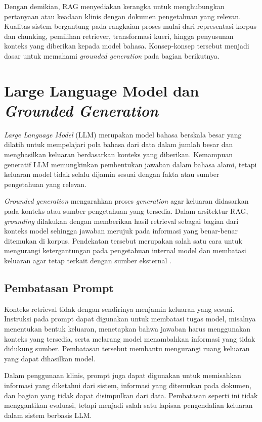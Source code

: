 Dengan demikian, RAG menyediakan kerangka untuk menghubungkan pertanyaan atau keadaan klinis dengan dokumen pengetahuan yang relevan. Kualitas sistem bergantung pada rangkaian
proses mulai dari representasi korpus dan chunking, pemilihan retriever, transformasi kueri, hingga penyusunan konteks yang diberikan kepada model bahasa.
Konsep-konsep tersebut menjadi dasar untuk memahami \textit{grounded generation} pada bagian berikutnya.

\section{Large Language Model dan \textit{Grounded Generation}}
\label{sec:bab2-llm-grounded-generation}

\textit{Large Language Model} (LLM) merupakan model bahasa berskala besar yang dilatih untuk mempelajari pola bahasa dari data dalam jumlah besar dan menghasilkan keluaran
berdasarkan konteks yang diberikan. Kemampuan generatif LLM memungkinkan pembentukan jawaban dalam bahasa alami, tetapi keluaran model tidak selalu dijamin sesuai dengan fakta
atau sumber pengetahuan yang relevan.

\textit{Grounded generation} mengarahkan proses \textit{generation} agar keluaran didasarkan pada konteks atau sumber pengetahuan yang tersedia. Dalam arsitektur RAG,
\textit{grounding} dilakukan dengan memberikan hasil retrieval sebagai bagian dari konteks model sehingga jawaban merujuk pada informasi yang benar-benar ditemukan di korpus.
Pendekatan tersebut merupakan salah satu cara untuk mengurangi ketergantungan pada pengetahuan internal model dan membatasi keluaran agar tetap terkait dengan sumber eksternal
\parencite{lewis2020,gao2023}.

\subsection{Pembatasan Prompt}
\label{subsec:bab2-prompt-constraints}

Konteks retrieval tidak dengan sendirinya menjamin keluaran yang sesuai. Instruksi pada prompt dapat digunakan untuk membatasi tugas model, misalnya menentukan bentuk
keluaran, menetapkan bahwa jawaban harus menggunakan konteks yang tersedia, serta melarang model menambahkan informasi yang tidak didukung sumber. Pembatasan tersebut membantu
mengurangi ruang keluaran yang dapat dihasilkan model.

Dalam penggunaan klinis, prompt juga dapat digunakan untuk memisahkan informasi yang diketahui dari sistem, informasi yang ditemukan pada dokumen, dan bagian yang tidak dapat
disimpulkan dari data. Pembatasan seperti ini tidak menggantikan evaluasi, tetapi menjadi salah satu lapisan pengendalian keluaran dalam sistem berbasis LLM.

